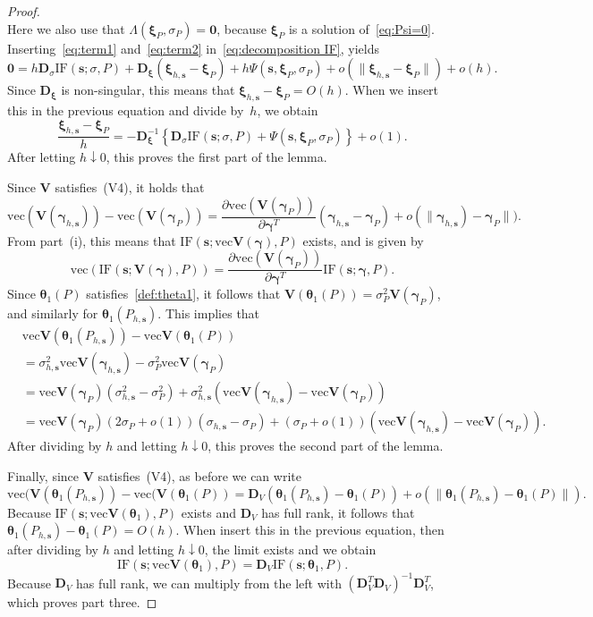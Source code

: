 \documentclass{article}
\numberwithin{equation}{section}
\theoremstyle{plain}
\newcommand{\vc}{\mathrm{vec}}
\newcommand{\btheta}{\bm\theta}
\newcommand{\bxi}{\bm\xi}
\newcommand{\bgamma}{\bm\gamma}
\newcommand{\bs}{\mathbf{s}}
\newcommand{\bV}{\mathbf{V}}
\newcommand{\bD}{\mathbf{D}}
\begin{document}
\begin{proof}
\begin{equation}
\end{equation}
Here we also use that $\Lambda(\bxi_P,\sigma_P)=\mathbf{0}$, because $\bxi_P$ is a solution of~\eqref{eq:Psi=0}.
Inserting~\eqref{eq:term1} and~\eqref{eq:term2} in~\eqref{eq:decomposition IF}, yields
\[
\mathbf{0}
=
h
\bD_{\sigma}
\text{IF}(\bs;\sigma,P)
+
\bD_{\bxi}
(\bxi_{h,\bs}-\bxi_P)
+
h\Psi(\bs,\bxi_P,\sigma_P)
+
o(\|\bxi_{h,\bs}-\bxi_P\|)
+
o(h).
\]
Since $\bD_{\bxi}$ is non-singular, this means that $\bxi_{h,\bs}-\bxi_P=O(h)$.
When we insert this in the previous equation and divide by~$h$, we obtain
\[
\frac{\bxi_{h,\bs}-\bxi_P}{h}
=
-\bD_{\bxi}^{-1}
\left\{
\bD_{\sigma}
\text{IF}(\bs;\sigma,P)
+
\Psi(\bs,\bxi_P,\sigma_P)
\right\}
+
o(1).
\]
After letting $h\downarrow0$, this proves the first part of the lemma.

Since $\bV$ satisfies~(V4), it holds that
\[
\vc(\bV(\bgamma_{h,\bs}))-\vc(\bV(\bgamma_P))
=
\frac{\partial\vc(\bV(\bgamma_P))}{\partial\bgamma^T}
(\bgamma_{h,\bs}-\bgamma_P)
+
o(\|\bgamma_{h,\bs})-\bgamma_P\|).
\]
From part~(i), this means that $\text{IF}(\bs;\vc\bV(\bgamma),P)$ exists, and is given by
\[
\vc(
\text{IF}(\bs;\bV(\bgamma),P))
=
\frac{\partial\vc(\bV(\bgamma_P))}{\partial\bgamma^T}
\text{IF}(\bs;\bgamma,P).
\]
Since $\btheta_1(P)$ satisfies~\eqref{def:theta1},
it follows that $\bV(\btheta_1(P))=\sigma^2_P\bV(\bgamma_P)$,
and similarly for $\btheta_1(P_{h,\bs})$.
This implies that
\[
\begin{split}
&
\vc\bV(\btheta_1(P_{h,\bs}))-\vc\bV(\btheta_1(P))\\
&=
\sigma_{h,\bs}^2
\vc\bV(\bgamma_{h,\bs})
-
\sigma_P^2
\vc\bV(\bgamma_P)\\
&=
\vc\bV(\bgamma_P)
\left(
\sigma_{h,\bs}^2-\sigma_P^2
\right)
+
\sigma_{h,\bs}^2
\left(
\vc\bV(\bgamma_{h,\bs})-\vc\bV(\bgamma_P)
\right)\\
&=
\vc\bV(\bgamma_P)(2\sigma_P+o(1))
\left(
\sigma_{h,\bs}-\sigma_P
\right)
+
(\sigma_P+o(1))
\left(
\vc\bV(\bgamma_{h,\bs})-\vc\bV(\bgamma_P)
\right).
\end{split}
\]
After dividing by $h$ and letting $h\downarrow0$, this proves the second part of the lemma.

Finally, since $\bV$ satisfies~(V4), as before we can write 
\[
\vc(\bV(\btheta_1(P_{h,\bs}))-\vc(\bV(\btheta_1(P))
=
\bD_V
(\btheta_1(P_{h,\bs})-\btheta_1(P))
+
o(\|\btheta_1(P_{h,\bs})-\btheta_1(P)\|).
\]
Because $\text{IF}(\bs;\vc\bV(\btheta_1),P)$ exists and $\bD_V$ has full rank,
it follows that $\btheta_1(P_{h,\bs})-\btheta_1(P)=O(h)$.
When insert this in the previous equation, then after dividing by $h$ and letting $h\downarrow0$,
the limit exists and we obtain
\[
\text{IF}(\bs;\vc\bV(\btheta_1),P)
=
\bD_V
\text{IF}(\bs;\btheta_1,P).
\]
Because $\bD_V$ has full rank, we can multiply from the left with $(\bD_V^T\bD_V)^{-1}\bD_V^T$,
which proves part three.
\end{proof}
\end{document}
